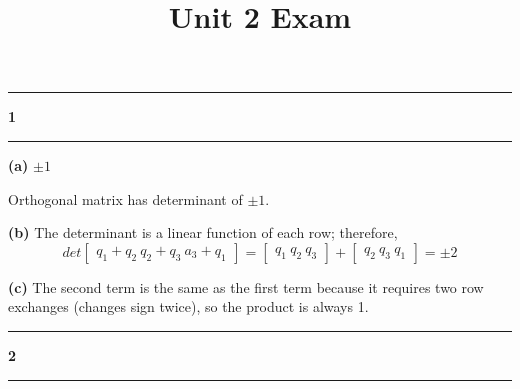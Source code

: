 \documentclass[11pt]{article}
\newcommand\question[2]{\vspace{.25in}\hrule\textbf{#1 #2}\vspace{.5em}\hrule\vspace{.10in}}
\renewcommand\part[1]{\vspace{.10in}\textbf{(#1)}}
\begin{document}
\raggedright
\newcommand\NAME{Haiying Cui}  %
\newcommand\ANDREWID{Christy}     %
\newcommand\HWNUM{}              %

\title{Unit 2 Exam}
\maketitle

\question{1}{}
\part{a} \(\pm1\)

Orthogonal matrix has determinant of \(\pm1\).

\part{b} The determinant is a linear function of each row; therefore,
$$det \begin{bmatrix} q_1+q_2 \ q_2+q_3 \ a_3+q_1 \end{bmatrix} = \begin{bmatrix} q_1 \ q_2 \ q_3 \end{bmatrix} + \begin{bmatrix} q_2 \ q_3 \ q_1 \end{bmatrix} = \pm2$$

\part{c} The second term is the same as the first term because it requires two row exchanges (changes sign twice), so the product is always 1.

\question{2}{}
\end{document}
